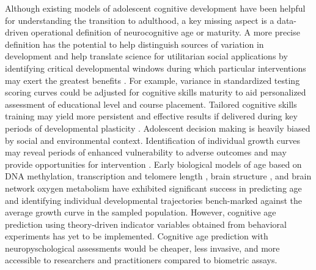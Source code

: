 \documentclass{article}%
\begin{document}
Although existing models of adolescent cognitive development have been helpful for understanding the transition to adulthood, a key missing aspect is a data-driven operational definition of neurocognitive age or maturity. A more precise definition has the potential to help distinguish sources of variation in development and help translate science for utilitarian social applications by identifying critical developmental windows during which particular interventions may exert the greatest benefits \citep{somerville2016searching}. For example, variance in standardized testing scoring curves could be adjusted for cognitive skills maturity to aid personalized assessment of educational level and course placement. Tailored cognitive skills training may yield more persistent and effective results if delivered during key periods of developmental plasticity \citep{knoll2016window}. Adolescent decision making is heavily biased by social and environmental context. Identification of individual growth curves may reveal periods of enhanced vulnerability to adverse outcomes and may provide opportunities for intervention \citep{kirisci2009violence}. Early biological models of age based on DNA methylation, transcription and telomere length \citep{baker1988biomarkers, jylhava2017biological}, brain structure \citep{khundrakpam2015prediction,aycheh2018biological,madan2018predicting}, and brain network oxygen metabolism \citep{dosenbach2010prediction, qin2015predicting} have exhibited significant success in predicting age and identifying individual developmental trajectories bench-marked against the average growth curve in the sampled population. However, cognitive age prediction using theory-driven indicator variables obtained from behavioral experiments has yet to be implemented. Cognitive age prediction with neuropyschological assessments would be cheaper, less invasive, and more accessible to researchers and practitioners compared to biometric assays.  
%
\end{document}
